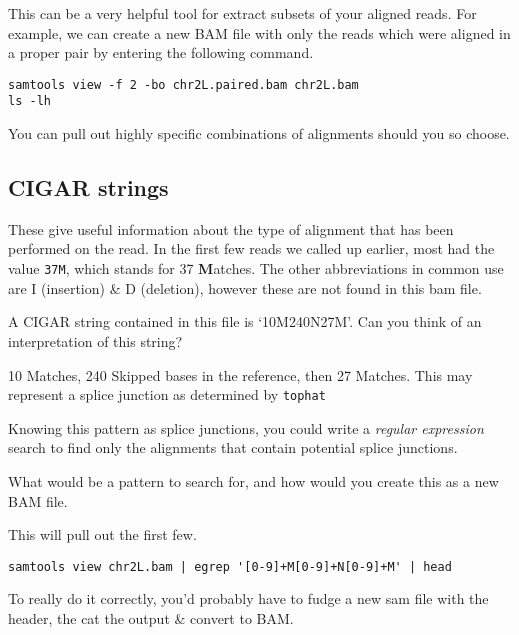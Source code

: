 \begin{information}
This can be a very helpful tool for extract subsets of your aligned reads.
For example, we can create a new BAM file with only the reads which were aligned in a proper pair by entering the following command.
\begin{lstlisting}
samtools view -f 2 -bo chr2L.paired.bam chr2L.bam
ls -lh
\end{lstlisting}
You can pull out highly specific combinations of alignments should you so choose.
\end{information}


\subsection{CIGAR strings}
\begin{note}
These give useful information about the type of alignment that has been performed on the read.
In the first few reads we called up earlier, most had the value \texttt{37M}, which stands for 37 \textbf{M}atches.
The other abbreviations in common use are I (insertion) \& D (deletion), however these are not found in this bam file.
\end{note}

\begin{questions}
A CIGAR string contained in this file is `10M240N27M'.
Can you think of an interpretation of this string? \\
\begin{answer}
10 Matches, 240 Skipped bases in the reference, then 27 Matches.
This may represent a splice junction as determined by \texttt{tophat}
\end{answer}
\end{questions}

\begin{advanced}
Knowing this pattern as splice junctions, you could write a \textit{regular expression} search to find only the alignments that contain potential splice junctions.
\begin{questions}
What would be a pattern to search for, and how would you create this as a new BAM file.
\begin{answer}
This will pull out the first few.
\begin{lstlisting}
samtools view chr2L.bam | egrep '[0-9]+M[0-9]+N[0-9]+M' | head
\end{lstlisting}
To really do it correctly, you'd probably have to fudge a new sam file with the header, the cat the output \& convert to BAM.
\end{answer}
\end{questions}
\end{advanced}

